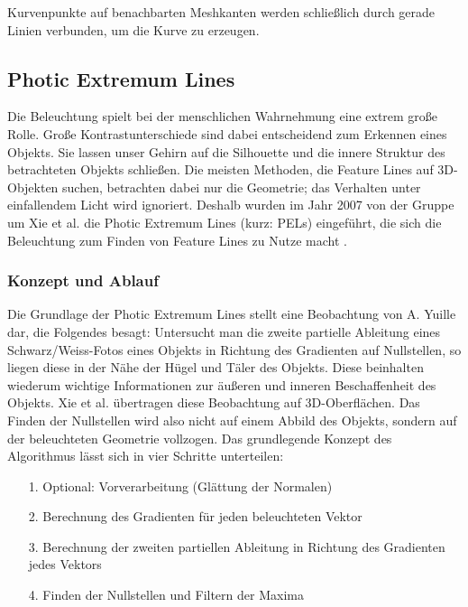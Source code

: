 \documentclass{paperStyle}
\begin{document}
  Kurvenpunkte auf benachbarten Meshkanten werden schließlich durch gerade Linien verbunden, um die Kurve zu erzeugen.
\subsection{Photic Extremum Lines}
Die Beleuchtung spielt bei der menschlichen Wahrnehmung eine extrem große Rolle. Große Kontrastunterschiede sind dabei entscheidend zum Erkennen eines Objekts. Sie lassen unser Gehirn auf die Silhouette und die innere Struktur des betrachteten Objekts schließen. Die meisten Methoden, die Feature Lines auf 3D-Objekten suchen, betrachten dabei nur die Geometrie; das Verhalten unter einfallendem Licht wird ignoriert. Deshalb wurden im Jahr 2007 von der Gruppe um Xie et al. die Photic Extremum Lines (kurz: PELs) eingeführt, die sich die Beleuchtung zum Finden von Feature Lines zu Nutze macht \cite{Xie2007} .
\label{pellabel}
\subsubsection{Konzept und Ablauf}
\label{defpel}
Die Grundlage der Photic Extremum Lines stellt eine Beobachtung von A. Yuille dar, die Folgendes besagt: Untersucht man die zweite partielle Ableitung eines Schwarz/Weiss-Fotos eines Objekts in Richtung des Gradienten auf Nullstellen, so liegen diese in der Nähe der Hügel und Täler des Objekts. Diese beinhalten wiederum wichtige Informationen zur äußeren und inneren Beschaffenheit des Objekts. Xie et al. übertragen diese Beobachtung auf 3D-Oberflächen. Das Finden der Nullstellen wird also nicht auf einem Abbild des Objekts, sondern auf der beleuchteten Geometrie vollzogen.
Das grundlegende Konzept des Algorithmus lässt sich in vier Schritte unterteilen:
\begin{itemize}
\item[1.] Optional: Vorverarbeitung (Glättung der Normalen)
\item[2.] Berechnung des Gradienten für jeden beleuchteten Vektor
\item[3.] Berechnung der zweiten partiellen Ableitung in Richtung des Gradienten jedes Vektors
\item[4.] Finden der Nullstellen und Filtern der Maxima

\end{itemize}
\end{document}
